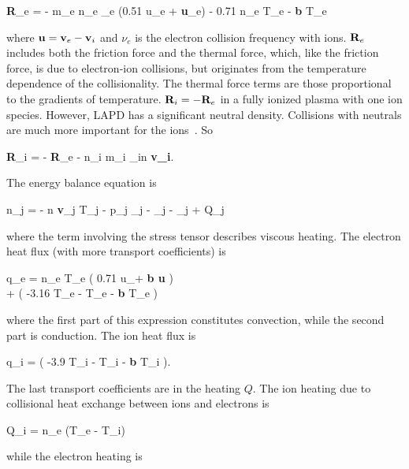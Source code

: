 \beq
\label{R_e}
{\bf R}_e = - m_e n_e \nu_e (0.51 u_{\para e} + {\bf u}_{\perp e}) - 0.71 n_e \gradpar T_e -   {\bf b \times} \grad T_e
\eeq

where ${\bf u} = {\bf v}_e - {\bf v}_i$ and $\nu_e$ is the electron collision frequency with ions. ${\bf R}_e$ includes both the friction force and the thermal force, which, like the friction
force, is due to electron-ion collisions, but originates from the temperature dependence of the collisionality. The thermal force terms are those proportional to the gradients of temperature.
${\bf R}_i = -{\bf R}_e$ in a fully ionized plasma with one ion species. However, LAPD has a significant neutral density.
Collisions with neutrals are much more important for the ions~\cite{Popovich2010a}. So

\beq
\label{R_i}
{\bf R}_i = - {\bf R}_e - n_i m_i \nu_{in} {\bf v_i}.
\eeq

The energy balance equation is

\beq
\label{brag_ener}
 n_j  = - n {\bf v}_j \cdot \grad T_j - p_j \grad {}_j - \grad {}_j - \Pi_{j \alpha \beta}  + Q_j
\eeq

where the term involving the stress tensor describes viscous heating. The electron heat flux (with more transport coefficients) is

\beqar
\label{elec_heat_flux}
q_e = n_e T_e \left( 0.71 u_\para +  {\bf b \times u} \right) \nonumber \\
+  \left( -3.16 \gradpar T_e -  \gradperp T_e -  {\bf b \times} \grad T_e \right)
\eeqar

where the first part of this expression constitutes convection, while the second part is conduction. The ion heat flux is

\beq
\label{ion_heat_flux}
q_i =  \left( -3.9 \gradpar T_i -  \gradperp T_i -  {\bf b \times} \grad T_i \right).
\eeq

The last transport coefficients are in the heating $Q$. The ion heating due to collisional heat exchange between ions and electrons is

\beq
\label{ion_heat_exchange}
Q_i =  n_e \nue (T_e - T_i)
\eeq

while the electron heating is

